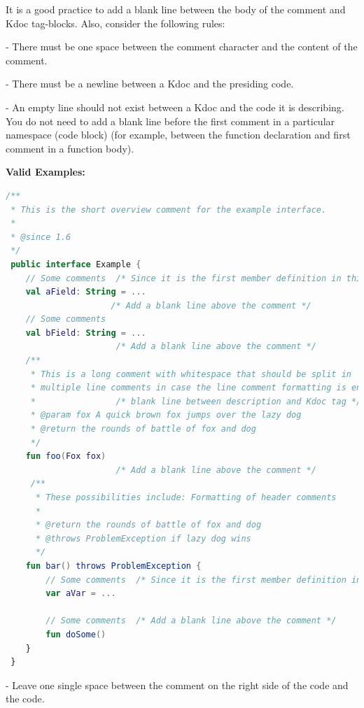 {{{{{{{{{{{{{{{{\label{sec:2.4.1}



It is a good practice to add a blank line between the body of the comment and Kdoc tag-blocks. Also, consider the following rules:

- There must be one space between the comment character and the content of the comment.

- There must be a newline between a Kdoc and the presiding code.

- An empty line should not exist between a Kdoc and the code it is describing. You do not need to add a blank line before the first comment in a particular namespace (code block) (for example, between the function declaration and first comment in a function body).



\textbf{Valid Examples:}



\begin{lstlisting}[language=Kotlin]
/** 
 * This is the short overview comment for the example interface.
 * 
 * @since 1.6
 */
 public interface Example {
    // Some comments  /* Since it is the first member definition in this code block, there is no need to add a blank line here */
    val aField: String = ...
                     /* Add a blank line above the comment */
    // Some comments
    val bField: String = ...
                      /* Add a blank line above the comment */
    /**
     * This is a long comment with whitespace that should be split in 
     * multiple line comments in case the line comment formatting is enabled.
     *                /* blank line between description and Kdoc tag */
     * @param fox A quick brown fox jumps over the lazy dog
     * @return the rounds of battle of fox and dog 
     */
    fun foo(Fox fox)
                      /* Add a blank line above the comment */
     /**
      * These possibilities include: Formatting of header comments
      * 
      * @return the rounds of battle of fox and dog
      * @throws ProblemException if lazy dog wins
      */
    fun bar() throws ProblemException {
        // Some comments  /* Since it is the first member definition in this range, there is no need to add a blank line here */
        var aVar = ...

        // Some comments  /* Add a blank line above the comment */            
        fun doSome()
    }
 }
\end{lstlisting}


- Leave one single space between the comment on the right side of the code and the code. 

}}}}}}}}}}}}}}}}
